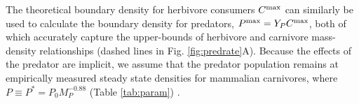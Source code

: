 \documentclass[]{rsos}%
\begin{document}
The theoretical boundary density for herbivore consumers $C^{\rm max}$ can similarly be used to calculate the boundary density for predators, $P^{\rm max} = Y_P C^{\rm max}$, both of which accurately capture the upper-bounds of herbivore and carnivore mass-density relationships (dashed lines in Fig. \ref{fig:predrate}A).
Because the effects of the predator are implicit, we assume that the predator population remains at empirically measured steady state densities for mammalian carnivores, where $P\equiv P^*= P_0M_P^{-0.88}$ (Table \ref{tab:param}) \cite{carbone2002common}.  




\end{document}
